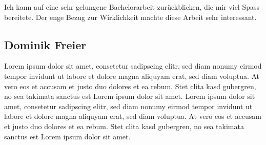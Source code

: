 Ich kann auf eine sehr gelungene Bachelorarbeit zurückblicken, die mir viel Spass bereitete. Der enge Bezug zur Wirklichkeit machte diese Arbeit sehr interessant. 

\pagebreak

\subsection*{Dominik Freier}
\tbd
Lorem ipsum dolor sit amet, consetetur sadipscing elitr, sed diam nonumy eirmod tempor invidunt ut labore et dolore magna aliquyam erat, sed diam voluptua. At vero eos et accusam et justo duo dolores et ea rebum. Stet clita kasd gubergren, no sea takimata sanctus est Lorem ipsum dolor sit amet. Lorem ipsum dolor sit amet, consetetur sadipscing elitr, sed diam nonumy eirmod tempor invidunt ut labore et dolore magna aliquyam erat, sed diam voluptua. At vero eos et accusam et justo duo dolores et ea rebum. Stet clita kasd gubergren, no sea takimata sanctus est Lorem ipsum dolor sit amet.